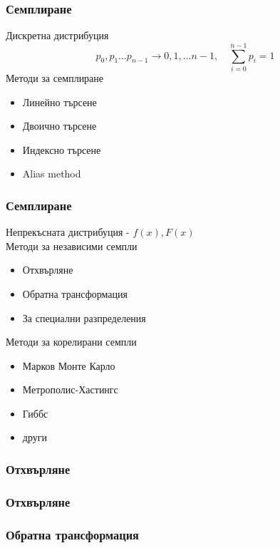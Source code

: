 
\begin{frame}
  \frametitle{Семплиране}
  Дискретна дистрибуция
  \pause
  \begin{equation*}
    p_0, p_1 \dots p_{n-1} \rightarrow 0, 1, \dots n-1, \quad \sum_{i=0}^{n-1}p_i = 1
  \end{equation*}
  \pause
  Методи за семплиране
  \begin{itemize}
   \item Линейно търсене \pause
   \item Двоично търсене \pause
   \item Индексно търсене \pause
   \item Alias method
  \end{itemize}
\end{frame}

\begin{frame}
  \frametitle{Семплиране}
  Непрекъсната дистрибуция - $f(x), F(x)$\\
  \pause
  Методи за независими семпли
  \begin{itemize}
   \item Отхвърляне \pause
   \item Обратна трансформация \pause
   \item За специални разпределения
  \end{itemize}
  \pause
  Методи за корелирани семпли
  \begin{itemize}
   \item Марков Монте Карло\pause
   \item Метрополис-Хастингс \pause
   \item Гиббс \pause
   \item други
  \end{itemize}
\end{frame}

\begin{frame}
  \frametitle{Отхвърляне}
\end{frame}

\begin{frame}
  \frametitle{Отхвърляне}
\end{frame}

\begin{frame}
  \frametitle{Обратна трансформация}
\end{frame}


